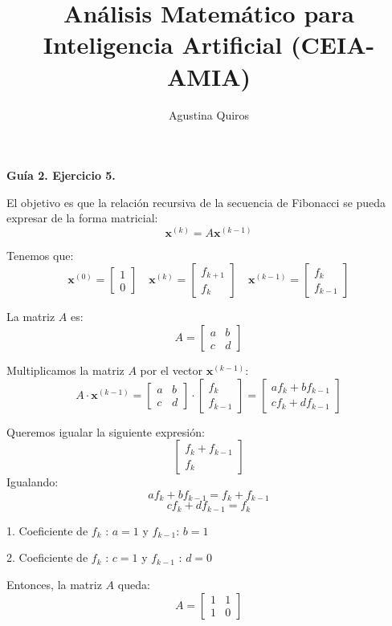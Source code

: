 \documentclass{article}
\title{\bf Análisis Matemático para Inteligencia Artificial (CEIA-AMIA)}
\author{Agustina Quiros}
\begin{document}
\maketitle

{\bfseries Guía 2. Ejercicio 5.} 

El objetivo es que la relación recursiva de la secuencia de Fibonacci se pueda expresar de la forma matricial:
\[
\mathbf{x}^{(k)} = A \mathbf{x}^{(k-1)}
\]

Tenemos que:
\[
\mathbf{x}^{(0)} = \begin{bmatrix}
1 \\
0
\end{bmatrix}
\quad
\mathbf{x}^{(k)} = \begin{bmatrix}
f_{k+1} \\
f_k
\end{bmatrix}
\quad
\mathbf{x}^{(k-1)} = \begin{bmatrix}
f_k \\
f_{k-1}
\end{bmatrix}
\]

La matriz \( A \) es:
\[
A = \begin{bmatrix}
a & b \\
c & d
\end{bmatrix}
\]

Multiplicamos la matriz \( A \) por el vector \(\mathbf{x}^{(k-1)}\):
\[
A \cdot \mathbf{x}^{(k-1)}
=
\begin{bmatrix}
a & b \\
c & d
\end{bmatrix}
\cdot
\begin{bmatrix}
f_k \\
f_{k-1}
\end{bmatrix}
=
\begin{bmatrix}
a f_k + b f_{k-1} \\
c f_k + d f_{k-1}
\end{bmatrix}
\]

Queremos igualar la siguiente expresión:
\[
\begin{bmatrix}
f_k + f_{k-1} \\
f_k
\end{bmatrix}
\]
Igualando:
\[
a f_k + b f_{k-1} = f_k + f_{k-1}
\]
\[
c f_k + d f_{k-1} = f_k
\]


1.  Coeficiente de \( f_k \) : \( a = 1 \) y \( f_{k-1} \): \( b = 1 \)

2.  Coeficiente de \( f_k \) : \( c = 1 \) y \( f_{k-1} \) : \( d = 0 \)

Entonces, la matriz \( A \) queda:
\[
A = \begin{bmatrix}
1 & 1 \\
1 & 0
\end{bmatrix}
\]
\end{document}
